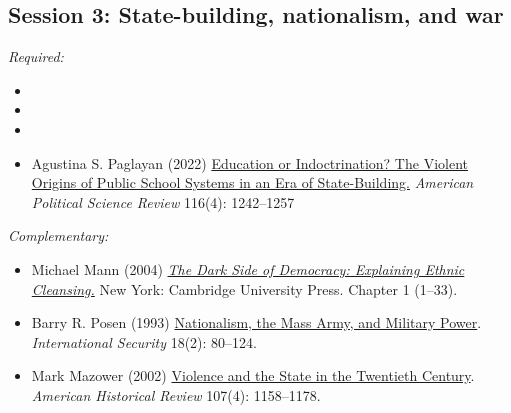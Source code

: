\documentclass[12pt, a4paper]{article}
\begin{document}
\vspace{20pt}
\hline
\subsection*{Session 3: State-building, nationalism, and war}

\noindent\textit{Required:}

\begin{itemize}
  \item {}
  \item {}
  \item {}
  \item Agustina S. Paglayan (2022) \href{https://doi.org/10.1017/S0003055422000247}{Education or Indoctrination? The Violent Origins of Public School Systems in an Era of State-Building.} \textit{American Political Science Review} 116(4): 1242--1257
\end{itemize}

\noindent\textit{Complementary:}

\begin{itemize}
  \item Michael Mann (2004) \href{https://www.cambridge.org/core/books/dark-side-of-democracy/7E75A132A188A2804E91F4F209B6FE1F}{\textit{The Dark Side of Democracy: Explaining Ethnic Cleansing.}} New York: Cambridge University Press. Chapter 1 (1--33).
  \item Barry R. Posen (1993) \href{https://doi.org/10.2307/2539098}{Nationalism, the Mass Army, and Military Power}. \textit{International Security} 18(2): 80--124.
  \item Mark Mazower (2002) \href{https://doi.org/10.1086/ahr/107.4.1158}{Violence and the State in the Twentieth Century}. \textit{American Historical Review} 107(4): 1158--1178.
\end{itemize}

\vspace{20pt}
\hline
\end{document}
